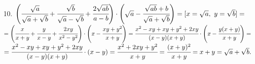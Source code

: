 10. $\left(\cfrac{\sqrt{a}}{\sqrt{a}+\sqrt{b}}+\cfrac{\sqrt{b}}{\sqrt{a}-\sqrt{b}}+
\cfrac{2\sqrt{ab}}{a-b}\right)\cdot\left(\sqrt{a}-\cfrac{\sqrt{ab}+b}{\sqrt{a}+\sqrt{b}}\right)=[x=\sqrt{a},\ y=\sqrt{b}]=$\\$=
\left(\cfrac{x}{x+y}+\cfrac{y}{x-y}+
\cfrac{2xy}{x^2-y^2}\right)\cdot\left(x-\cfrac{xy+y^2}{x+y}\right)=\cfrac{x^2-xy+xy+y^2+2xy}{(x-y)(x+y)}\cdot\left(x-\cfrac{y(x+y)}{x+y}\right)=$\\$=
\cfrac{x^2-xy+xy+y^2+2xy}{(x-y)(x+y)}\cdot(x-y)=\cfrac{x^2+2xy+y^2}{x+y}=\cfrac{(x+y)^2}{x+y}=x+y=\sqrt{a}+\sqrt{b}.$\\
